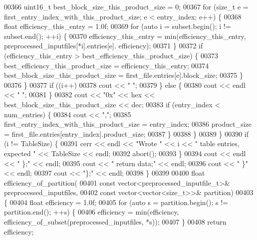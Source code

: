 \begin{DoxyCode}
{{00366       uint16\_t best\_block\_size\_this\_product\_size = 0;
00367       \textcolor{keywordflow}{for} (\textcolor{keywordtype}{size\_t} e = first\_entry\_index\_with\_this\_product\_size; e < entry\_index; e++) \{
00368         \textcolor{keywordtype}{float} efficiency\_this\_entry = 1.0f;
00369         \textcolor{keywordflow}{for} (\textcolor{keyword}{auto} i = subset.begin(); i != subset.end(); ++i) \{
00370           efficiency\_this\_entry = min(efficiency\_this\_entry, preprocessed\_inputfiles[*i].entries[e].
      efficiency);
00371         \}
00372         \textcolor{keywordflow}{if} (efficiency\_this\_entry > best\_efficiency\_this\_product\_size) \{
00373           best\_efficiency\_this\_product\_size = efficiency\_this\_entry;
00374           best\_block\_size\_this\_product\_size = first\_file.entries[e].block\_size;
00375         \}
00376       \}
00377       \textcolor{keywordflow}{if} ((i++) %
00378         cout << \textcolor{stringliteral}{" "};
00379       \} \textcolor{keywordflow}{else} \{
00380         cout << endl << \textcolor{stringliteral}{"      "};
00381       \}
00382       cout << \textcolor{stringliteral}{"0x"} << hex << best\_block\_size\_this\_product\_size << dec;
00383       \textcolor{keywordflow}{if} (entry\_index < num\_entries) \{
00384         cout << \textcolor{stringliteral}{","};
00385         first\_entry\_index\_with\_this\_product\_size = entry\_index;
00386         product\_size = first\_file.entries[entry\_index].product\_size;
00387       \}
00388     \}
00389   \}
00390   \textcolor{keywordflow}{if} (i != TableSize) \{
00391     cerr << endl << \textcolor{stringliteral}{"Wrote "} << i << \textcolor{stringliteral}{" table entries, expected "} << TableSize << endl;
00392     abort();
00393   \}
00394   cout << endl << \textcolor{stringliteral}{"    \};"} << endl;
00395   cout << \textcolor{stringliteral}{"    return data;"} << endl;
00396   cout << \textcolor{stringliteral}{"  \}"} << endl;
00397   cout << \textcolor{stringliteral}{"\};"} << endl;
00398 \}
00399 
00400 \textcolor{keywordtype}{float} efficiency\_of\_partition(
00401         \textcolor{keyword}{const} vector<preprocessed\_inputfile\_t>& preprocessed\_inputfiles,
00402         \textcolor{keyword}{const} vector<vector<size\_t>>& partition)
00403 \{
00404   \textcolor{keywordtype}{float} efficiency = 1.0f;
00405   \textcolor{keywordflow}{for} (\textcolor{keyword}{auto} s = partition.begin(); s != partition.end(); ++s) \{
00406     efficiency = min(efficiency, efficiency\_of\_subset(preprocessed\_inputfiles, *s));
00407   \}
00408   \textcolor{keywordflow}{return} efficiency;
}}
\end{DoxyCode}

